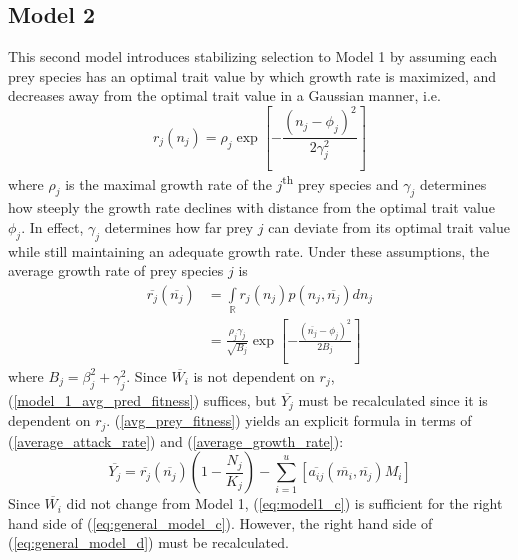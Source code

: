 \documentclass{amsart}
\theoremstyle{definition}
\theoremstyle{remark}
\numberwithin{equation}{section}
\begin{document}
\subsection{Model 2}
This second model introduces stabilizing selection to Model 1 by assuming each prey species has an optimal trait value by which growth rate is maximized, and decreases away from the optimal trait value in a Gaussian manner, i.e.
\begin{equation}
	\label{growth_rate}
	r_j(n_j) = \rho_j\exp{\left[-\frac{(n_j - \phi_j)^2}{2\gamma_j^2}\right]}
\end{equation}
where $\rho_j$ is the maximal growth rate of the $j$\textsuperscript{th} prey species and $\gamma_j$ determines how steeply the growth rate declines with distance from the optimal trait value $\phi_j$.  In effect, $\gamma_j$ determines how far prey $j$ can deviate from its optimal trait value while still maintaining an adequate growth rate.  Under these assumptions, the average growth rate of prey species $j$ is
\begin{equation}
	\label{average_growth_rate}
	\begin{aligned}
		\overline{r_j}(\overline{n_j}) &= \int\limits_{\mathbb{R}}^{}r_j(n_j)p(n_j, \overline{n_j})dn_j \\
		&= \frac{\rho_j\gamma_j}{\sqrt{B_j}}\exp\left[-\frac{(\overline{n_j} - \phi_j)^2}{2B_j}\right]
	\end{aligned}
\end{equation}
where $B_j = \beta_j^2 + \gamma_j^2$.  Since $\overline{W_i}$ is not dependent on $r_j$, (\ref{model_1_avg_pred_fitness}) suffices, but $\overline{Y_j}$ must be recalculated since it is dependent on $r_j$.  (\ref{avg_prey_fitness}) yields an explicit formula in terms of (\ref{average_attack_rate}) and (\ref{average_growth_rate}):
\begin{equation}
	\label{model_2_avg_prey_fitness}
	\overline{Y_j} = \overline{r_j}(\overline{n_j})\left(1 - \frac{N_j}{K_j}\right) - \sum\limits_{i = 1}^{u}\left[\overline{a_{ij}}(\overline{m_i}, \overline{n_j})M_i\right]
\end{equation}
Since $\overline{W_i}$ did not change from Model 1, (\ref{eq:model1_c}) is sufficient for the right hand side of (\ref{eq:general_model_c}).  However, the right hand side of (\ref{eq:general_model_d}) must be recalculated.
\end{document}
